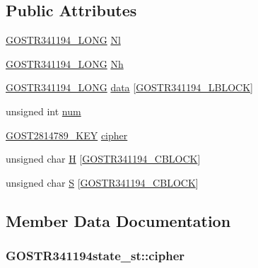 \subsection*{Public Attributes}
\begin{DoxyCompactItemize}
\item 
\hyperlink{gost_8h_ab26a3a5b329db18421b294a988fb9182}{G\+O\+S\+T\+R341194\+\_\+\+L\+O\+NG} \hyperlink{struct_g_o_s_t_r341194state__st_a3828ade31401440954270121cd33ed1a}{Nl}
\item 
\hyperlink{gost_8h_ab26a3a5b329db18421b294a988fb9182}{G\+O\+S\+T\+R341194\+\_\+\+L\+O\+NG} \hyperlink{struct_g_o_s_t_r341194state__st_a8fe637797280e1c61a352012700d46b0}{Nh}
\item 
\hyperlink{gost_8h_ab26a3a5b329db18421b294a988fb9182}{G\+O\+S\+T\+R341194\+\_\+\+L\+O\+NG} \hyperlink{struct_g_o_s_t_r341194state__st_acce5d551a5aefd231a22c82ad6e9a309}{data} \mbox{[}\hyperlink{gost_8h_afa0b594cb427f38b013ce4d36e6ae0ed}{G\+O\+S\+T\+R341194\+\_\+\+L\+B\+L\+O\+CK}\mbox{]}
\item 
unsigned int \hyperlink{struct_g_o_s_t_r341194state__st_a220d369a14a4761264ca4ea112f7786c}{num}
\item 
\hyperlink{gost_8h_aebf1a56a3926ee4c9130714ec49fcfc0}{G\+O\+S\+T2814789\+\_\+\+K\+EY} \hyperlink{struct_g_o_s_t_r341194state__st_a91e800aa0fee22a977e91325059539ef}{cipher}
\item 
unsigned char \hyperlink{struct_g_o_s_t_r341194state__st_a27982d411df34040a40ff22b8af1c96e}{H} \mbox{[}\hyperlink{gost_8h_a7cca514a7487fedf680c59bb0681c11c}{G\+O\+S\+T\+R341194\+\_\+\+C\+B\+L\+O\+CK}\mbox{]}
\item 
unsigned char \hyperlink{struct_g_o_s_t_r341194state__st_a10d2c1e5b4d530eb80254a8d28cb99ff}{S} \mbox{[}\hyperlink{gost_8h_a7cca514a7487fedf680c59bb0681c11c}{G\+O\+S\+T\+R341194\+\_\+\+C\+B\+L\+O\+CK}\mbox{]}
\end{DoxyCompactItemize}


\subsection{Member Data Documentation}
\subsubsection[{\texorpdfstring{cipher}{cipher}}]{ G\+O\+S\+T\+R341194state\+\_\+st\+::cipher}\hypertarget{struct_g_o_s_t_r341194state__st_a91e800aa0fee22a977e91325059539ef}{}\label{struct_g_o_s_t_r341194state__st_a91e800aa0fee22a977e91325059539ef}
